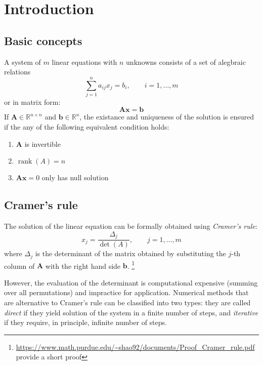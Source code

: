 \documentclass{article}
\DeclareMathOperator{\rank}{rank}
\begin{document}
\section{Introduction}
\subsection{Basic concepts}
A system of $m$ linear equations with $n$ unknowns consists of a set of alegbraic relations
\begin{equation*}
    \sum_{j=1}^n a_{ij}x_j = b_i,\qquad i = 1, \dots, m
\end{equation*}
or in matrix form:
\begin{equation}
    \label{matrixform}
    \mathbf{A}\mathbf{x} = \mathbf{b}
\end{equation}
If $\mathbf{A}\in \mathbb{R}^{n\times n}$ and $\mathbf{b}\in \mathbb{R}^{n}$, the 
existance and uniqueness of the solution is ensured if the any of the following equivalent 
condition holds:
\begin{enumerate}
    \item $\mathbf{A}$ is invertible
    \item $\rank(A) = n$
    \item $\mathbf{A}\mathbf{x} =0$ only has null solution
\end{enumerate}

\subsection{Cramer's rule}
The solution of the linear equation can be formally obtained using \emph{Cramer's rule}:
\begin{equation}
    \label{cramer_rule}
    x_j = \frac{\Delta_j}{\det(A)},\qquad j = 1, \dots, m  
\end{equation}
where $\Delta_j$ is the determinant of the matrix obtained by substituting the $j$-th 
column of $\mathbf{A}$ with the right hand side $\mathbf{b}$.
\footnote{\url{https://www.math.purdue.edu/~shao92/documents/Proof_Cramer_rule.pdf} provide a short proof}

However, the evaluation of the determinant is computational expensive (summing over all 
permutations) and impractice for application. Numerical methods that are alternative to 
Cramer's rule can be classified into two types:
they are called \emph{direct} if they yield solution of the system in a finite number of 
steps, and \emph{iterative} if they require, in principle, infinite number of steps.
\end{document}
